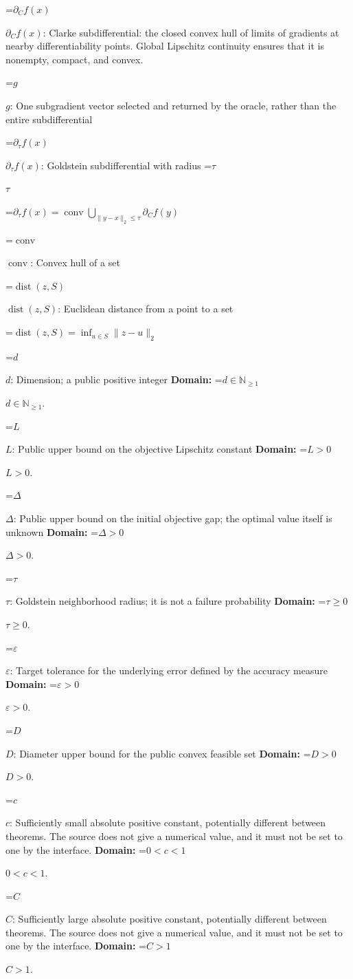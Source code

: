 \documentclass[10pt,a4paper]{article}
\newcommand{\AtlasMath}[1]{\par\begingroup\centering\setbox0=\hbox{$\displaystyle #1$}\ifdim\wd0>1.4\linewidth\typeout{ATLAS WIDE FORMULA: \the\wd0}\fi\ifdim\wd0>\linewidth\resizebox{\linewidth}{!}{\box0}\else\box0\fi\par\endgroup}
\newcommand{\AtlasInlineMath}[1]{\begingroup\setbox0=\hbox{$#1$}\ifdim\wd0>.4\linewidth\endgroup\AtlasMath{#1}\else\endgroup$#1$\fi}
\begin{document}
\AtlasInlineMath{\partial_C f(x)}: Clarke subdifferential: the closed convex hull of limits of gradients at nearby differentiability points. Global Lipschitz continuity ensures that it is nonempty, compact, and convex.

\AtlasInlineMath{g}: One subgradient vector selected and returned by the oracle, rather than the entire subdifferential

\AtlasInlineMath{\partial_\tau f(x)}: Goldstein subdifferential with radius \AtlasInlineMath{\tau}


\AtlasMath{\partial_\tau f(x)=\operatorname{conv}\bigcup_{\|y-x\|_2\le\tau}\partial_C f(y)}


\AtlasInlineMath{\operatorname{conv}}: Convex hull of a set

\AtlasInlineMath{\operatorname{dist}(z,S)}: Euclidean distance from a point to a set


\AtlasMath{\operatorname{dist}(z,S)=\inf_{u\in S}\|z-u\|_2}


\AtlasInlineMath{d}: Dimension; a public positive integer \textbf{Domain:} \AtlasInlineMath{d\in\mathbb{N}_{\ge1}}.

\AtlasInlineMath{L}: Public upper bound on the objective Lipschitz constant \textbf{Domain:} \AtlasInlineMath{L>0}.

\AtlasInlineMath{\Delta}: Public upper bound on the initial objective gap; the optimal value itself is unknown \textbf{Domain:} \AtlasInlineMath{\Delta>0}.

\AtlasInlineMath{\tau}: Goldstein neighborhood radius; it is not a failure probability \textbf{Domain:} \AtlasInlineMath{\tau\ge0}.

\AtlasInlineMath{\varepsilon}: Target tolerance for the underlying error defined by the accuracy measure \textbf{Domain:} \AtlasInlineMath{\varepsilon>0}.

\AtlasInlineMath{D}: Diameter upper bound for the public convex feasible set \textbf{Domain:} \AtlasInlineMath{D>0}.

\AtlasInlineMath{c}: Sufficiently small absolute positive constant, potentially different between theorems. The source does not give a numerical value, and it must not be set to one by the interface. \textbf{Domain:} \AtlasInlineMath{0<c<1}.

\AtlasInlineMath{C}: Sufficiently large absolute positive constant, potentially different between theorems. The source does not give a numerical value, and it must not be set to one by the interface. \textbf{Domain:} \AtlasInlineMath{C>1}.
\end{document}
